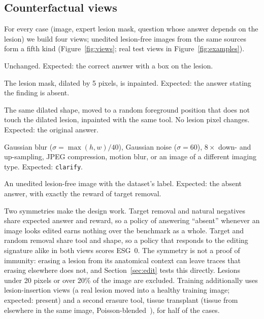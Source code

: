 \documentclass[11pt]{article}
\begin{document}
\subsection{Counterfactual views}\label{sec:views}
For every case (image, expert lesion mask, question whose answer depends on the lesion) we build four views; unedited lesion-free images from the same sources form a fifth kind (Figure~\ref{fig:views}; real test views in Figure~\ref{fig:examples}).
\begin{description}[leftmargin=*,nosep,font=\normalfont\itshape]
\item[Original.] Unchanged. Expected: the correct answer with a box on the lesion.
\item[Target removal.] The lesion mask, dilated by 5 pixels, is inpainted. Expected: the answer stating the finding is absent.
\item[Random removal (control).] The same dilated shape, moved to a random foreground position that does not touch the dilated lesion, inpainted with the same tool. No lesion pixel changes. Expected: the original answer.
\item[Degraded.] Gaussian blur ($\sigma=\max(h,w)/40$), Gaussian noise ($\sigma=60$), $8\times$ down- and up-sampling, JPEG compression, motion blur, or an image of a different imaging type. Expected: \texttt{clarify}.
\item[Natural negative.] An unedited lesion-free image with the dataset's label. Expected: the absent answer, with exactly the reward of target removal.
\end{description}
Two symmetries make the design work. Target removal and natural negatives share expected answer and reward, so a policy of answering ``absent'' whenever an image looks edited earns nothing over the benchmark as a whole. Target and random removal share tool and shape, so a policy that responds to the editing signature alike in both views scores ESG~0. The symmetry is not a proof of immunity: erasing a lesion from its anatomical context can leave traces that erasing elsewhere does not, and Section~\ref{sec:edit} tests this directly. Lesions under 20 pixels or over 20\% of the image are excluded. Training additionally uses lesion-insertion views (a real lesion moved into a healthy training image; expected: present) and a second erasure tool, tissue transplant (tissue from elsewhere in the same image, Poisson-blended~\cite{poisson}), for half of the cases.
\end{document}
